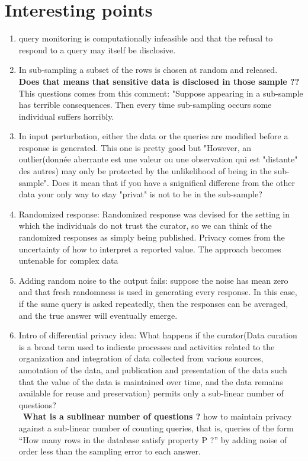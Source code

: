 \documentclass[10pt,a4paper]{report}
\begin{document}
\section{Interesting points}
\begin{enumerate}
\item query monitoring is computationally infeasible and that the refusal to respond to a query may itself be disclosive.
\item In sub-sampling a subset of the rows is chosen at 
random and released.\\
\textbf{Does that means that sensitive data is disclosed in those sample ??} This questions comes from this comment: "Suppose appearing in a sub-sample has terrible consequences. Then every time sub-sampling occurs some individual suffers horribly.
\item In input perturbation, either the data or the queries are modified before a response is generated. This one is pretty good but "However, an outlier(donnée aberrante est une valeur ou une observation qui est "distante" des autres) may only be protected by the unlikelihood of being in the sub-sample". Does it mean that if you have a snignifical differene from the other data your only way to stay "privat" is not to be in the sub-sample?
\item Randomized response: Randomized response was devised for the setting in which the individuals do not trust the curator, so we can think of the randomized responses as simply being published. Privacy comes from the uncertainty  of how to interpret a reported value. The approach becomes untenable for complex data
\item Adding random noise to the output fails: suppose the noise has mean zero and that fresh randomness is used in generating every response. In this case, if the same query is asked repeatedly, then the responses can be averaged, and the true answer will eventually emerge.
\item Intro of differential privacy idea: What happens if the curator(Data curation is a broad term used to indicate processes and activities related to the organization and integration of data collected from various sources, annotation of the data, and publication and presentation of the data such that the value of the data is maintained over time, and the data remains available for reuse and preservation) permits only a sub-linear number of questions?\\\
\textbf{What is a sublinear number of questions ?} how to maintain privacy against a sub-linear number of counting  queries, that is, queries of the form “How many rows in the database satisfy property P ?” by adding noise of order less than the sampling error to each answer.

\end{enumerate}
\end{document}
